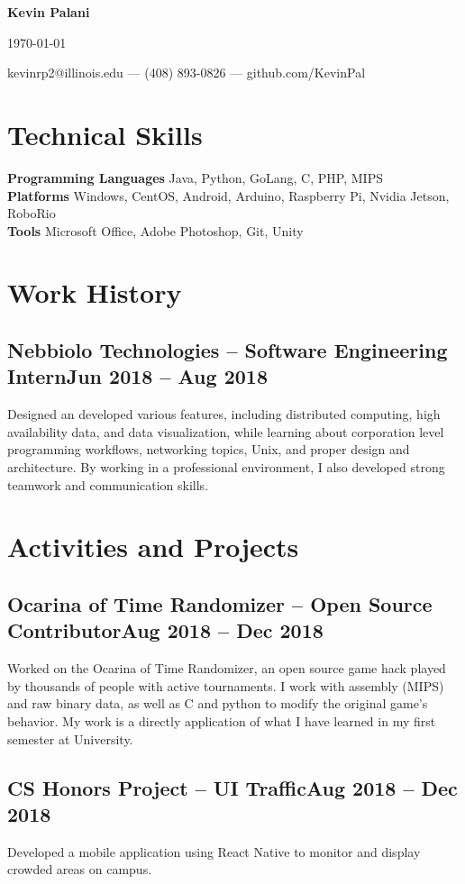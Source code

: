 \documentclass[letterpaper,11pt]{article}
\makeatletter
\newcommand\textbox[1]{%
	\parbox{.333\textwidth}{#1}%
}
\renewcommand{\maketitle}{
	\begin{center}
		\noindent\textbox{\hfill}\textbox{\hfil\bfseries\huge Kevin Palani\hfil}\textbox{\hfill \today}
		{kevinrp2@illinois.edu --- (408) 893-0826 --- github.com/KevinPal}
	\end{center} }
\makeatother
\begin{document}
\maketitle
\section{Technical Skills}
{\bfseries Programming Languages} Java, Python, GoLang, C, PHP, MIPS\\
{\bfseries Platforms} Windows, CentOS, Android, Arduino, Raspberry Pi, Nvidia Jetson, RoboRio\\
{\bfseries Tools} Microsoft Office, Adobe Photoshop, Git, Unity
\vspace*{-2mm}
\section{Work History}
\subsection{Nebbiolo Technologies -- Software Engineering Intern\null\hfill Jun 2018 -- Aug 2018}
Designed an developed various features, including distributed computing, high availability data, and data visualization, while learning about corporation level programming workflows, networking topics, Unix, and proper design and architecture.
By working in a professional environment, I also developed strong teamwork and communication skills.
\vspace*{-2mm}
\section{Activities and Projects}
\subsection{Ocarina of Time Randomizer -- Open Source Contributor\null\hfill Aug 2018 -- Dec 2018}
Worked on the Ocarina of Time Randomizer, an open source game hack played by thousands of people with active tournaments. I work with assembly (MIPS) and raw binary data, as well as C and python to modify the original game's behavior.
My work is a directly application of what I have learned in my first semester at University.
\vspace*{-2mm}
\subsection{CS Honors Project -- UI Traffic\null\hfill Aug 2018 -- Dec 2018}
Developed a mobile application using React Native to monitor and display crowded areas on campus.
\vspace*{-2mm}
\end{document}
